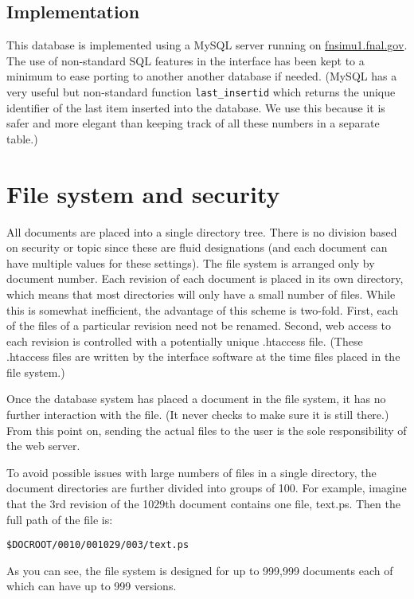 \documentclass[12pt]{article}
\begin{document}
\subsection{Implementation}

This database is implemented using a MySQL server running on
\url{fnsimu1.fnal.gov}.  The use of non-standard SQL features in the interface
has been kept to a minimum to ease porting to another another database if needed.
(MySQL has a very useful but non-standard function \texttt{last\_insertid} which
returns the unique identifier of the last item inserted into the database. We use
this because it is safer and more elegant than keeping track of all these numbers
in a separate table.)

\section{File system and security}

All documents are placed into a single directory tree. There is no  division
based on security or topic since these are fluid designations  (and each
document can have multiple values for these settings). The  file system is
arranged only by document number. Each revision of each  document is placed in
its own directory, which means that most  directories will only have a small
number of files. While this is somewhat inefficient, the  advantage of this
scheme is two-fold. First, each of the files of a  particular revision need not
be renamed. Second, web access to each  revision is controlled with a
potentially unique .htaccess file. (These .htaccess files are written by the
interface software at the time files placed in the file system.)

Once the database system has placed a document in the file system, it has no
further interaction with the file. (It never checks to make sure it is still
there.) From this point on, sending the actual files to the user is the sole
responsibility of the web server.

To avoid possible issues with large numbers of files in a single 
directory, the document directories are further divided into groups of 
100. For example, imagine that the 3rd revision of the 1029th document 
contains one file, text.ps. Then the full path of the file is:

\texttt{\$DOCROOT/0010/001029/003/text.ps}

As you can see, the file system is designed for up to 999,999 documents 
each of which can have up to 999 versions.
\end{document}
